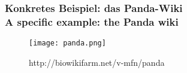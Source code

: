 \documentclass[13pt]{beamer}
\begin{document}
%
%

\begin{frame}
  \frametitle{Konkretes Beispiel: das Panda-Wiki\\\textcolor{mfn_green}{A specific example: the Panda wiki}}
  \begin{figure}
    \texttt{[image: panda.png]}
    \caption{http://biowikifarm.net/v-mfn/panda}
  \end{figure}
\end{frame}
\end{document}
